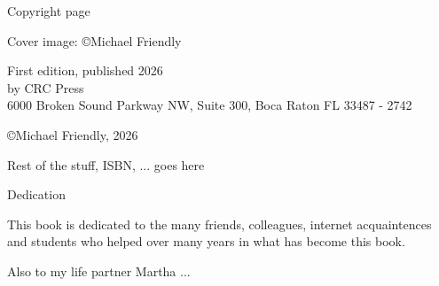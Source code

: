 
\thispagestyle{empty}

\Large{Copyright page}

Cover image: \copyright Michael Friendly

First edition, published 2026 \\
by CRC Press \\
6000 Broken Sound Parkway NW, Suite 300, Boca Raton FL 33487 - 2742

\copyright Michael Friendly, 2026

Rest of the stuff, ISBN, ... goes here

\cleardoublepage

\begin{center}
\Large{Dedication}

This book is dedicated to the many friends, colleagues, internet acquaintences and students who helped over many years in what has become this book.

Also to my life partner Martha ...
\end{center}

\setlength{\abovedisplayskip}{-5pt}
\setlength{\abovedisplayshortskip}{-5pt}



\hfuzz=5.002pt